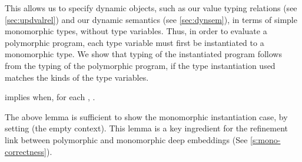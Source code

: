 \documentclass[9pt\ifFinal\else,preprint,nocopyrightspace\fi,\ifAlpha\else natbib,authoryear\fi]{sigplanconf}
\begin{document}
This allows us to specify dynamic objects, such as our value typing relations (see \autoref{sec:updvalrel}) and our dynamic semantics (see \autoref{sec:dynsem}), in
terms of simple monomorphic types, without type variables. Thus, in order to evaluate a polymorphic program, each type variable must first be instantiated
to a monomorphic type. We show that typing of the instantiated program follows from the typing of the polymorphic program, if the type instantiation used matches
the kinds of the type variables.

\begin{lemma}
\label{lemma:spec} 

      implies  when, for each , .
\end{lemma}
\noindent The above lemma is sufficient to show the monomorphic instantiation case, by setting  (the empty context). This lemma is a
key ingredient for the refinement link between polymorphic and monomorphic deep embeddings (See \autoref{s:mono-correctness}).
\end{document}

